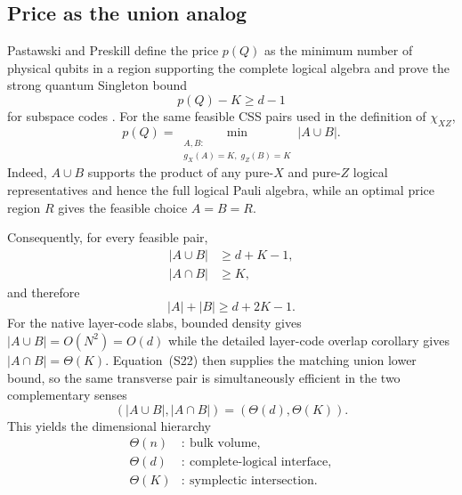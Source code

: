 \documentclass[aps,prx,reprint,superscriptaddress,nofootinbib,floatfix,longbibliography]{revtex4-2}
\theoremstyle{definition}
\begin{document}
\subsection{Price as the union analog}
Pastawski and Preskill define the price $p(Q)$ as the minimum number of
physical qubits in a region supporting the complete logical algebra and prove
the strong quantum Singleton bound
\begin{equation}
 p(Q)-K\ge d-1 \tag{S22}
\end{equation}
for subspace codes \cite{PastawskiPreskillPrice}.  For the same feasible CSS
pairs used in the definition of $\chi_{XZ}$,
\begin{equation}
 p(Q)=\min_{\substack{A,B:\\g_X(A)=K,\;g_Z(B)=K}}|A\cup B|. \tag{S23}
\end{equation}
Indeed, $A\cup B$ supports the product of any pure-$X$ and pure-$Z$ logical
representatives and hence the full logical Pauli algebra, while an optimal
price region $R$ gives the feasible choice $A=B=R$.

Consequently, for every feasible pair,
\begin{align*}
 |A\cup B|&\ge d+K-1,\\
 |A\cap B|&\ge K,
\end{align*}
and therefore
\begin{equation}
 |A|+|B|\ge d+2K-1. \tag{S24}
\end{equation}
For the native layer-code slabs, bounded density gives
$|A\cup B|=O(N^2)=O(d)$ while the detailed layer-code overlap corollary gives $|A\cap B|=\Theta(K)$.  Equation~(S22)
then supplies the matching union lower bound, so the same transverse pair is
simultaneously efficient in the two complementary senses
\begin{equation}
 (|A\cup B|,|A\cap B|)=(\Theta(d),\Theta(K)). \tag{S25}
\end{equation}
This yields the dimensional hierarchy
\begin{equation}
\begin{aligned}
 \Theta(n)&:\ \text{bulk volume},\\
 \Theta(d)&:\ \text{complete-logical interface},\\
 \Theta(K)&:\ \text{symplectic intersection}.
\end{aligned}\tag{S26}
\end{equation}
\end{document}
